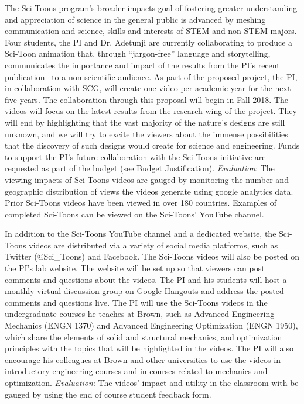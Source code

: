 \documentclass[10pt,letterpaper]{article}
\begin{document}
    The Sci-Toons program's broader impacts goal of fostering greater understanding and appreciation of science in the general public is advanced by meshing communication and science, skills and interests of STEM and non-STEM majors. Four students, the PI and Dr. Adetunji are currently collaborating to produce a Sci-Toon animation that, through ``jargon-free'' language and storytelling, communicates the importance and impact of the results from the PI's recent publication~\cite{monn2015new} to a non-scientific audience. As part of the proposed project, the PI, in collaboration with SCG, will create one video per academic year for the next five years. The collaboration through this proposal will begin in Fall 2018. The videos will focus on the latest results from the research wing of the project. They will end by highlighting that the vast majority of the nature's designs are still unknown, and we will try to excite the viewers about the immense possibilities that the discovery of such designs would create for science and engineering. Funds to support the PI's future collaboration with the Sci-Toons initiative are requested as part of the budget (see Budget Justification). \emph{Evaluation}: The viewing impacts of Sci-Toons videos are gauged by monitoring the number and geographic distribution of views the videos generate using google analytics data. Prior Sci-Toons videos have been viewed in over 180 countries. Examples of completed Sci-Toons can be viewed on the Sci-Toons' YouTube channel.

    In addition to the Sci-Toons YouTube channel and a dedicated website, the Sci-Toons videos are distributed via a variety of social media platforms, such as Twitter (@Sci\_Toons) and Facebook. The Sci-Toons videos will also be posted on the PI's lab website. The website will be set up so that viewers can post comments and questions about the videos. The PI and his students will host a monthly virtual discussion group on Google Hangouts and address the posted comments and questions live. The PI will use the Sci-Toons videos in the undergraduate courses he teaches at Brown, such as Advanced Engineering Mechanics (ENGN 1370) and Advanced Engineering Optimization (ENGN 1950), which share the elements of solid and structural mechanics, and optimization principles with the topics that will be highlighted in the videos. The PI will also encourage his colleagues at Brown and other universities to use the videos in introductory engineering courses and in courses related to mechanics and optimization. \emph{Evaluation}: The videos' impact and utility in the classroom with be gauged by using the end of course student feedback form.
\end{document}
